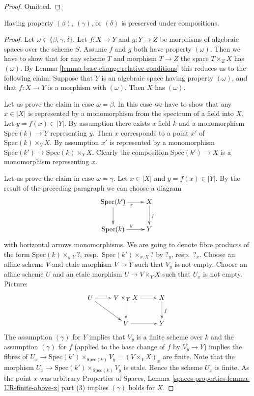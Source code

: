 \begin{proof}
Omitted.
\end{proof}

\begin{lemma}
\label{lemma-composition-relative-conditions}
Having property $(\beta)$, $(\gamma)$, or $(\delta)$
is preserved under compositions.
\end{lemma}

\begin{proof}
Let $\omega \in \{\beta, \gamma, \delta\}$.
Let $f : X \to Y$ and $g : Y \to Z$ be morphisms of algebraic spaces
over the scheme $S$. Assume $f$ and $g$ both have property
$(\omega)$. Then we have to show
that for any scheme $T$ and morphism $T \to Z$ the space $T \times_Z X$
has $(\omega)$. By
Lemma \ref{lemma-base-change-relative-conditions}
this reduces us to the following claim: Suppose that $Y$ is an algebraic
space having property $(\omega)$, and that $f : X \to Y$ is a morphism
with $(\omega)$. Then $X$ has $(\omega)$.

\medskip\noindent
Let us prove the claim in case $\omega = \beta$. In this case we have to show
that any $x \in |X|$ is represented by a monomorphism from the spectrum
of a field into $X$. Let $y = f(x) \in |Y|$. By assumption there exists
a field $k$ and a monomorphism $\text{Spec}(k) \to Y$ representing $y$.
Then $x$ corresponds to a point $x'$ of $\text{Spec}(k) \times_Y X$.
By assumption $x'$ is represented by a monomorphism
$\text{Spec}(k') \to \text{Spec}(k) \times_Y X$. Clearly the composition
$\text{Spec}(k') \to X$ is a monomorphism representing $x$.

\medskip\noindent
Let us prove the claim in case $\omega = \gamma$.
Let $x \in |X|$ and $y = f(x) \in |Y|$. By the result of the preceding
paragraph we can choose a diagram
$$
\xymatrix{
\text{Spec}(k') \ar[r]_x \ar[d] & X \ar[d]^f \\
\text{Spec}(k) \ar[r]^y & Y
}
$$
with horizontal arrows monomorphisms. We are going to denote
fibre products of the form $\text{Spec}(k) \times_{y, Y} ?$,
resp.\ $\text{Spec}(k') \times_{x, X} ?$ by $?_y$, resp.\ $?_x$.
Choose an affine scheme $V$ and etale morphism $V \to Y$
such that $V_y$ is not empty. Choose an affine scheme $U$ and an
etale morphism $U \to V \times_Y X$ such that
$U_x$ is not empty. Picture:
$$
\xymatrix{
U \ar[r] \ar[rd] & V \times_Y X \ar[d] \ar[r] & X \ar[d]^f \\
 & V \ar[r] & Y
}
$$
The assumption $(\gamma)$ for $Y$ implies that $V_y$ is a finite scheme
over $k$ and the assumption $(\gamma)$ for $f$ (applied to the base change
of $f$ by $V_y \to Y$) implies the fibres of
$U_x \to \text{Spec}(k') \times_{\text{Spec}(k)} V_y = (V \times_Y X)_x$
are finite. Note that the morphism
$U_x \to \text{Spec}(k') \times_{\text{Spec}(k)} V_y$ is etale.
Hence the scheme $U_x$ is finite. As the point $x$ was arbitrary
Properties of Spaces,
Lemma \ref{spaces-properties-lemma-UR-finite-above-x} part (3)
implies $(\gamma)$ holds for $X$.


\end{proof}
